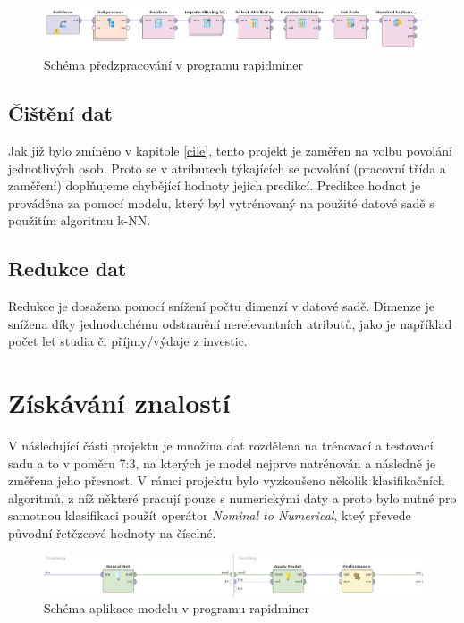 \documentclass[11pt,a4paper,titlepage]{article}
\begin{document}
        \begin{figure}[H]
            \centering
            \includegraphics[width=1\textwidth]{./img/predzpracovani.png}
            \caption{Schéma předzpracování v programu rapidminer}
        \end{figure}
        
        \subsection{Čištění dat}
            Jak již bylo zmíněno v kapitole \ref{cile}, tento projekt je zaměřen na volbu povolání jednotlivých osob. Proto se v atributech týkajících se povolání (pracovní třída a zaměření) doplňujeme chybějící hodnoty jejich predikcí. Predikce hodnot je prováděna za pomocí modelu, který byl vytrénovaný na použité datové sadě s použitím algoritmu k-NN.
        
        \subsection{Redukce dat}
            Redukce je dosažena pomocí snížení počtu dimenzí v datové sadě. Dimenze je snížena díky jednoduchému odstranění nerelevantních atributů, jako je například
            počet let studia či příjmy/výdaje z investic.
    
    \section{Získávání znalostí}
        V následující části projektu je množina dat rozdělena na trénovací a testovací sadu a to v poměru 7:3, na kterých je model nejprve natrénován a následně je změřena jeho přesnost. V rámci projektu bylo vyzkoušeno několik klasifikačních algoritmů, z níž některé pracují pouze s numerickými daty a proto bylo nutné pro samotnou klasifikaci použít operátor \textit{Nominal to Numerical}, kteý převede původní řetězcové hodnoty na číselné.

        \begin{figure}[H]
            \centering
            \includegraphics[width=1\textwidth]{./img/zpracovani.png}
            \caption{Schéma aplikace modelu v programu rapidminer}
        \end{figure}
\end{document}
